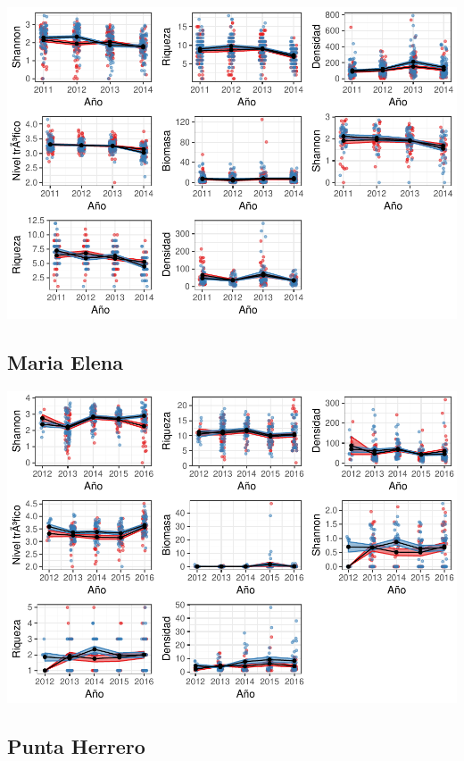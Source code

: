 \documentclass[12pt,]{article}
\begin{document}
\includegraphics{Manuscript_files/figure-latex/unnamed-chunk-9-1.pdf}

\subsection{Maria Elena}\label{maria-elena}

\includegraphics{Manuscript_files/figure-latex/unnamed-chunk-10-1.pdf}

\subsection{Punta Herrero}\label{punta-herrero}
\end{document}
